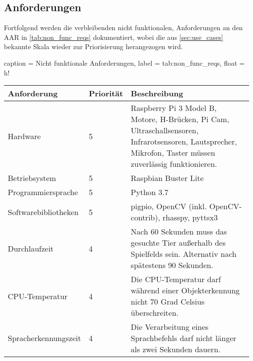 \subsection{Anforderungen}

Fortfolgend werden die verbleibenden nicht funktionalen, Anforderungen an den \ac{AAR} in \autoref{tab:non_func_reqs} dokumentiert, wobei die aus \autoref{sec:use_cases} bekannte Skala wieder zur Priorisierung herangezogen wird.

\begin{dhbwtable}{%
    caption	= Nicht funktionale Anforderungen,
    label	= tab:non_func_reqs,
    float = h!
}
    \begin{tabularx}{\textwidth}{llp{}}
        \toprule
        \textbf{Anforderung}    & \textbf{Priorität} & \textbf{Beschreibung} \\\midrule
        Hardware                & 5 & Raspberry Pi 3 Model B, Motore, H-Brücken, Pi Cam, Ultraschallsensoren, Infrarotsensoren, Lautsprecher, Mikrofon, Taster müssen zuverlässig funktionieren. \\
        Betriebsystem           & 5 & Raspbian Buster Lite \\
        Programmiersprache      & 5 & Python 3.7 \\
        Softwarebibliotheken    & 5 & pigpio, OpenCV (inkl. OpenCV-contrib), rhasspy, pyttsx3 \\
        Durchlaufzeit           & 4 & Nach 60 Sekunden muss das gesuchte Tier außerhalb des Spielfelds sein. Alternativ nach spätestens 90 Sekunden. \\
        \ac{CPU}-Temperatur     & 4 & Die \ac{CPU}-Temperatur darf während einer Objekterkennung nicht 70 Grad Celsius überschreiten.\\
        Spracherkennungszeit    & 4 & Die Verarbeitung eines Sprachbefehls darf nicht länger als zwei Sekunden dauern.\\\bottomrule
    \end{tabularx}
\end{dhbwtable}